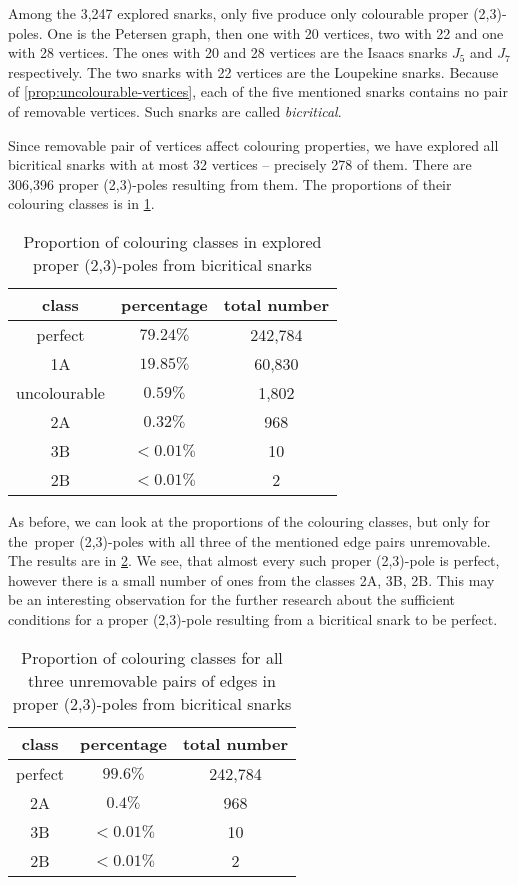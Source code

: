 Among the 3,247 explored snarks, only five produce only colourable proper (2,3)-poles. One is the Petersen graph, then one with 20 vertices, two with 22 and one with 28 vertices. The ones with 20 and 28 vertices are the Isaacs snarks $J_5$ and $J_7$ respectively. The two snarks with 22 vertices are the Loupekine snarks. Because of \cref{prop:uncolourable-vertices}, each of the five mentioned snarks contains no pair of removable vertices. Such snarks are called \textit{bicritical}.

Since removable pair of vertices affect colouring properties, we have explored all bicritical snarks with at most 32 vertices -- precisely 278 of them. There are 306,396 proper (2,3)-poles resulting from them. The proportions of their colouring classes is in \cref{tab:proportion-bicritical}.

\begin{table}[h!]
	\centering
	\begin{tabular}{ |c|c|c| } 
		\hline
		class & percentage & total number \\ [0.5ex] 
		\hline\hline
		perfect & $79.24\%$ & 242,784 \\ 
		\hline
		1A & $19.85\%$ & 60,830 \\ 
		\hline
		uncolourable & $0.59\%$ & 1,802 \\ 
		\hline
		2A & $0.32\%$ & 968 \\ 
		\hline
		3B & $< 0.01\%$ & 10 \\ 
		\hline
		2B & $< 0.01\%$ & 2 \\ 
		\hline
	\end{tabular}
	\caption{Proportion of colouring classes in explored proper (2,3)-poles from bicritical snarks}
	\label{tab:proportion-bicritical}
\end{table}

As before, we can look at the proportions of the colouring classes, but only for the~proper (2,3)-poles with all three of the mentioned edge pairs unremovable. The results are in \cref{tab:proportion-bicritical-all-unremovable}. We see, that almost every such proper (2,3)-pole is perfect, however there is a small number of ones from the classes 2A, 3B, 2B. This may be an interesting observation for the further research about the sufficient conditions for a proper (2,3)-pole resulting from a bicritical snark to be perfect.

\begin{table}[h!]
	\centering
	\begin{tabular}{ |c|c|c| } 
		\hline
		class & percentage & total number \\ [0.5ex] 
		\hline\hline
		perfect & $99.6\%$ & 242,784 \\ 
		\hline
		2A & $0.4\%$ & 968 \\ 
		\hline
		3B & $< 0.01\%$ & 10 \\ 
		\hline
		2B & $< 0.01\%$ & 2 \\ 
		\hline
	\end{tabular}
	\caption{Proportion of colouring classes for all three unremovable pairs of edges in proper (2,3)-poles from bicritical snarks}
	\label{tab:proportion-bicritical-all-unremovable}
\end{table}